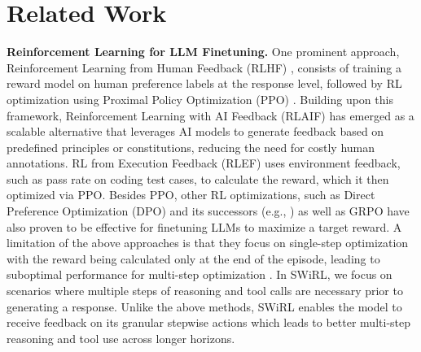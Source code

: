 \documentclass{article} %
\begin{document}
\section{Related Work}

\noindent\textbf{Reinforcement Learning for LLM Finetuning.} One prominent approach, Reinforcement Learning from Human Feedback (RLHF) \citep{ouyang2022traininglanguagemodelsfollow,christiano2017rlhf}, consists of training a reward model on human preference labels at the response level, followed by RL optimization using Proximal Policy Optimization (PPO) \citep{schulman2017proximalpolicyoptimizationalgorithms}. Building upon this framework, Reinforcement Learning with AI Feedback (RLAIF) \citep{bai2022constitutionalaiharmlessnessai} has emerged as a scalable alternative that leverages AI models to generate feedback based on predefined principles or constitutions, reducing the need for costly human annotations. RL from Execution Feedback (RLEF) \citep{gehring2025rlefgroundingcodellms} uses environment feedback, such as pass rate on coding test cases, to calculate the reward, which it then optimized via PPO. Besides PPO, other RL optimizations, such as Direct Preference Optimization (DPO) \citep{rafailov2023direct} and its successors (e.g., \citet{azar2023generaltheoreticalparadigmunderstand,ethayarajh2024ktomodelalignmentprospect,meng2024simposimplepreferenceoptimization,lanchantin2025diversepreferenceoptimization}) as well as GRPO \citep{shao2024deepseekmathpushinglimitsmathematical} have also proven to be effective for finetuning LLMs to maximize a target reward. 
A limitation of the above approaches is that they focus on single-step optimization with the reward being calculated only at the end of the episode, leading to suboptimal performance for multi-step optimization \citep{liu2024enhancingmultistepreasoningabilities,wang2024offlinereinforcementlearningllm}. In SWiRL, we focus on scenarios where multiple steps of reasoning and tool calls are necessary prior to generating a response. Unlike the above methods, SWiRL enables the model to receive feedback on its granular stepwise actions which leads to better multi-step reasoning and tool use across longer horizons.
\end{document}
